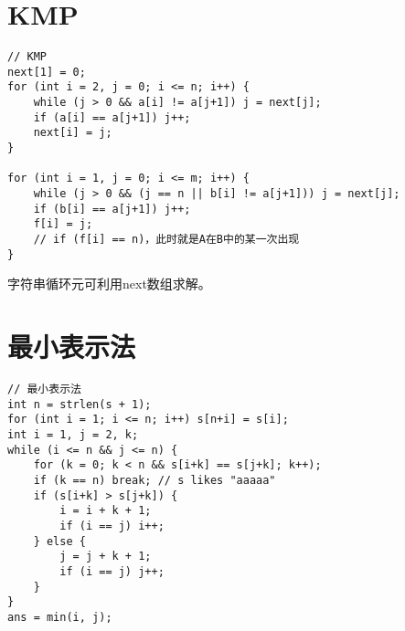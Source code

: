 \section{KMP}
\begin{lstlisting}
// KMP
next[1] = 0;
for (int i = 2, j = 0; i <= n; i++) {
    while (j > 0 && a[i] != a[j+1]) j = next[j];
    if (a[i] == a[j+1]) j++;
    next[i] = j;
}

for (int i = 1, j = 0; i <= m; i++) {
    while (j > 0 && (j == n || b[i] != a[j+1])) j = next[j];
    if (b[i] == a[j+1]) j++;
    f[i] = j;
    // if (f[i] == n)，此时就是A在B中的某一次出现
}
\end{lstlisting}
字符串循环元可利用next数组求解。
\section{最小表示法}
\begin{lstlisting}
// 最小表示法
int n = strlen(s + 1);
for (int i = 1; i <= n; i++) s[n+i] = s[i];
int i = 1, j = 2, k;
while (i <= n && j <= n) {
    for (k = 0; k < n && s[i+k] == s[j+k]; k++);
    if (k == n) break; // s likes "aaaaa"
    if (s[i+k] > s[j+k]) {
        i = i + k + 1;
        if (i == j) i++;
    } else {
        j = j + k + 1;
        if (i == j) j++;
    }
}
ans = min(i, j);
\end{lstlisting}